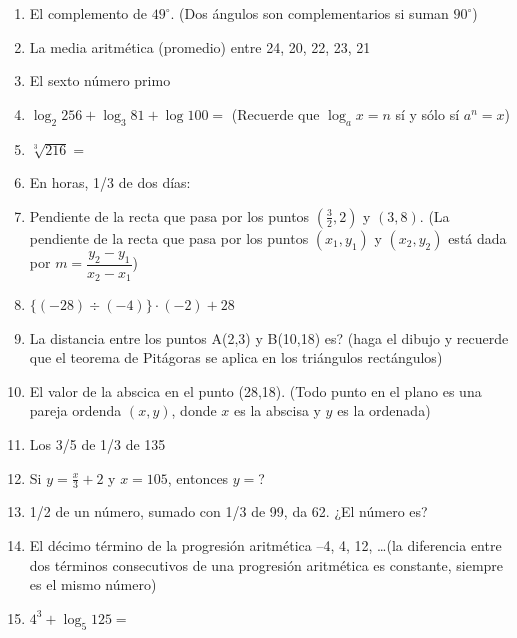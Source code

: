 \documentclass[11pt,twoside,letter]{article}
\begin{document}
\begin{enumerate}
 \item El complemento de $49^{\circ}$. (Dos ángulos son complementarios si suman $90^{\circ}$)
 \item La media aritmética (promedio) entre 24, 20, 22, 23, 21
 \item El sexto número primo
 \item $\log_{2}256+\log_{3}81+\log100=$ (Recuerde que $\log_{a}x=n$ s\'{i} y s\'{o}lo s\'{i} $a^{n}=x$)
 \item $\sqrt[3]{216}=$
 \item En horas, 1/3 de dos días:
 \item Pendiente de la recta que pasa por los puntos $\left(\frac{3}{2},2\right)$ y $(3,8)$. (La pendiente de la recta que pasa por los puntos $(x_{1},y_{1})$ y $(x_{2},y_{2})$ está dada por $m=\dfrac{y_{2}-y_{1}}{x_{2}-x_{1}}$)
 \item $\{(-28)\div(-4)\}\cdot(-2)+28$
 \item La distancia entre los puntos A(2,3) y B(10,18) es? (haga el dibujo y recuerde que el teorema de Pitágoras se aplica en los triángulos rectángulos)
 \item El valor de la abscica en el punto (28,18). (Todo punto en el plano es una pareja ordenda $(x,y)$, donde $x$ es la abscisa y $y$ es la ordenada)
 \item Los 3/5 de 1/3 de 135
 \item Si $y=\frac{x}{3}+2$ \; y \; $x=105$, entonces $y=$?
 \item 1/2 de un número, sumado con 1/3 de 99, da 62. ¿El número es?
 \item El décimo término de la progresión aritmética --4, 4, 12, \ldots (la diferencia entre dos términos consecutivos de una progresión aritmética es constante, siempre es el mismo número)
 \item $4^{3}+\log_{5}125=$
\end{enumerate}
\end{document}
